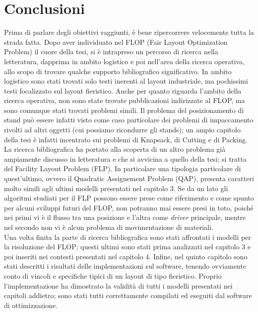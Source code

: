 \documentclass[12pt,a4paper,openright,twoside]{report}
\begin{document}
\chapter{Conclusioni}                   %
Prima di parlare degli obiettivi raggiunti, \`{e} bene ripercorrere velocemente tutta la strada fatta. Dopo aver individuato nel FLOP (Fair Layout Optimization Problem) il cuore della tesi, si \`{e} intrapreso un percorso di ricerca nella letteratura, dapprima in ambito logistico e poi nell'area della ricerca operativa, allo scopo di trovare qualche supporto bibliografico significativo. In ambito logistico sono stati trovati solo testi inerenti al layout industriale, ma pochissimi testi focalizzato sul layout fieristico. Anche per quanto riguarda l'ambito della ricerca operativa, non sono state trovate pubblicazioni indirizzate al FLOP, ma sono comunque stati trovati problemi simili. Il problema del posizionamento di stand pu\`{o} essere infatti visto come caso particolare dei problemi di impaccamento rivolti ad altri oggetti (cui possiamo ricondurre gli stands); un ampio capitolo della tesi \`{e} infatti incentrato sui problemi di Knapsack, di Cutting e di Packing.
La ricerca bibliografica ha portato alla scoperta di un altro problema gi\`{a} ampiamente discusso in letteratura e che si avvicina a quello della tesi; si tratta del Facility Layout Problem (FLP). In particolare una tipologia particolare di quest'ultimo, ovvero il Quadratic Assignement Problem (QAP), presenta caratteri molto simili agli ultimi modelli presentati nel capitolo 3. Se da un lato gli algoritmi studiati per il FLP possono essere prese come riferimento e come spunto per alcuni sviluppi futuri del FLOP, non potranno mai essere presi in toto, poich\'{e} nei primi vi \`{e} il flusso tra una posizione e l'altra come \textit{driver} principale, mentre nel secondo non vi \`{e} alcun problema di movimentazione di materiali.\\
Una volta finita la parte di ricerca bibliografica sono stati affrontati i modelli per la risoluzione del FLOP; questi ultimi sono stati prima analizzati nel capitolo 3 e poi inseriti nei contesti presentati nel capitolo 4. Infine, nel quinto capitolo sono stati descritti i risultati delle implementazioni sul software, tenendo ovviamente conto di vincoli e specifiche tipici di un layout di tipo fieristico.
Proprio l'implementazione ha dimostrato la validit\`{a} di tutti i modelli presentati nei capitoli addietro; sono stati tutti correttamente compilati ed eseguiti dal software di ottimizzazione. 
\end{document}
